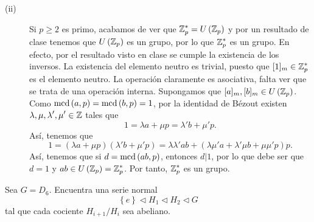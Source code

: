 \documentclass{article}
\begin{document}
\begin{sol}
\begin{description}
\item[(ii)] Si $\displaystyle p \geq 2 $ es primo, acabamos de ver que $\displaystyle \mathbb{Z}^{*}_{p} = U\left(\mathbb{Z}_{p}\right) $ y por un resultado de clase tenemos que $\displaystyle U\left(\mathbb{Z}_{p}\right) $ es un grupo, por lo que $\displaystyle \mathbb{Z}_{p}^{*} $ es un grupo. En efecto, por el resultado visto en clase se cumple la existencia de los inversos. La existencia del elemento neutro es trivial, puesto que $\displaystyle [1]_{m} \in \mathbb{Z}_{p}^{*} $ es el elemento neutro. La operación claramente es asociativa, falta ver que se trata de una operación interna. 
	Supongamos que $\displaystyle [a]_{m}, [b]_{m} \in U\left(\mathbb{Z}_{p}\right) $. Como $\displaystyle \text{mcd}\left(a,p\right) = \text{mcd}\left(b,p\right) = 1 $, por la identidad de Bézout existen $\displaystyle \lambda, \mu, \lambda', \mu' \in \mathbb{Z} $ tales que
	\[ 1 = \lambda a + \mu p = \lambda'b+ \mu' p .\]
	Así, tenemos que
	\[ 1 = \left(\lambda a + \mu p\right)\left(\lambda'b+\mu'p\right) = \lambda \lambda' ab + \left(\lambda \mu'a + \lambda'\mu b + \mu \mu 'p\right)p .\]
	Así, tenemos que si $\displaystyle d = \text{mcd}\left(ab, p\right) $, entonces $\displaystyle d | 1 $, por lo que debe ser que $\displaystyle d = 1 $ y $\displaystyle ab \in U\left(\mathbb{Z}_{p}\right) = \mathbb{Z}_{p}^{*} $. Por tanto, $\displaystyle \mathbb{Z}^{*}_{p} $ es un grupo.
\end{description}
\end{sol}

\begin{ej}
Sea $\displaystyle G = D_{6} $. Encuentra una serie normal
\[ \left\{ e\right\} \lhd H_{1} \lhd H_{2} \lhd G \]
tal que cada cociente $\displaystyle H_{i+1}/H_{i} $ sea abeliano.
\end{ej}
\end{document}

